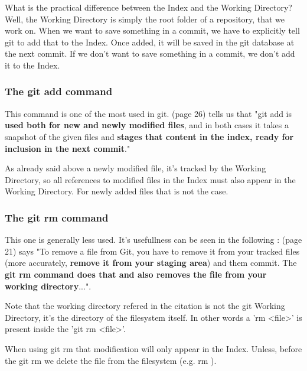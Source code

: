 What is the practical difference between the Index and the Working
Directory? Well, the Working Directory is simply the root folder of a repository,
that we work on. When we want to save something in a commit, we have to explicitly 
tell git to add that to the Index. Once added, it
will be saved in the git database at the next commit. If we don't want to save
something in a commit, we  don't add it to the Index.

\subsubsection{The git add command}

This command is one of the most used in git. \cite{gitComm} (page 26)
tells us that
"git add is {\bf used both for new and newly modified files},
and in both cases it takes a snapshot of the given files
and {\bf stages that content in the index, ready for inclusion
in the next commit}." \par 
As already said above a newly modified file, it's tracked by
the Working Directory, so all references to modified files in
the Index must also appear in the Working Directory. For newly
added files that is not the case.

\subsubsection{The git rm command}

This one is generally less used. It's usefullness can be
seen in the following : \cite{progit}
(page 21) says "To remove a file from Git, you have to remove it
from your tracked files (more accurately, {\bf remove it from your
staging area}) and them commit. The {\bf git rm command does that
and also removes the file from your working directory}...". \par
Note that the working directory refered in the citation is not
the git Working Directory, it's the directory of the filesystem itself.
In other words a 'rm <file>' is present inside the 'git rm <file>'. \par
When using git rm
that modification will only appear in the Index. Unless, before
the git rm we delete the file from the filesystem (e.g. rm ). \par

